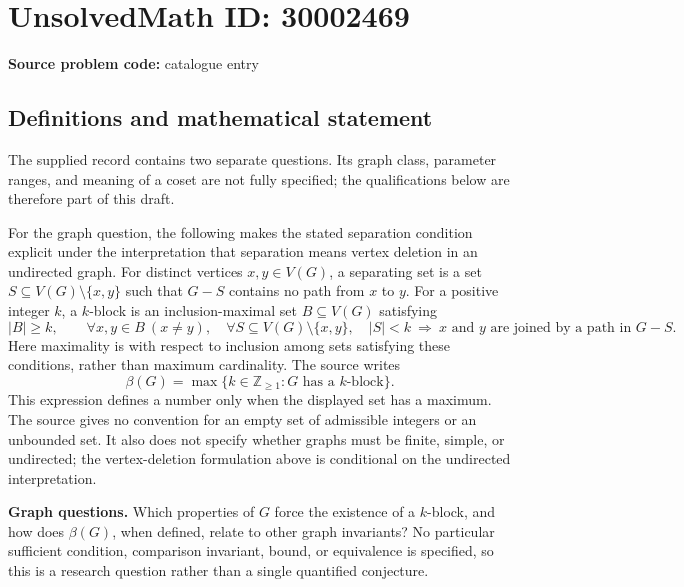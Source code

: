 \documentclass[11pt]{article}
\newcommand{\Z}{\mathbb{Z}}
\begin{document}
\section*{UnsolvedMath ID: 30002469}
\textbf{Source problem code:} catalogue entry
\subsection{Definitions and mathematical statement}
The supplied record contains two separate questions. Its graph class, parameter ranges, and meaning of a coset are not fully specified; the qualifications below are therefore part of this draft.

For the graph question, the following makes the stated separation condition explicit under the interpretation that separation means vertex deletion in an undirected graph. For distinct vertices \(x,y\in V(G)\), a separating set is a set \(S\subseteq V(G)\setminus\{x,y\}\) such that \(G-S\) contains no path from \(x\) to \(y\). For a positive integer \(k\), a \(k\)-block is an inclusion-maximal set \(B\subseteq V(G)\) satisfying
\[
 |B|\ge k,\qquad
 \forall x,y\in B\ (x\ne y),\quad
 \forall S\subseteq V(G)\setminus\{x,y\},\quad
 |S|<k\ \Longrightarrow\ x\text{ and }y\text{ are joined by a path in }G-S.
\]
Here maximality is with respect to inclusion among sets satisfying these conditions, rather than maximum cardinality. The source writes
\[
 \beta(G)=\max\{k\in\Z_{\ge1}:G\text{ has a }k\text{-block}\}.
\]
This expression defines a number only when the displayed set has a maximum. The source gives no convention for an empty set of admissible integers or an unbounded set. It also does not specify whether graphs must be finite, simple, or undirected; the vertex-deletion formulation above is conditional on the undirected interpretation.

\textbf{Graph questions.} Which properties of \(G\) force the existence of a \(k\)-block, and how does \(\beta(G)\), when defined, relate to other graph invariants? No particular sufficient condition, comparison invariant, bound, or equivalence is specified, so this is a research question rather than a single quantified conjecture.
\end{document}
